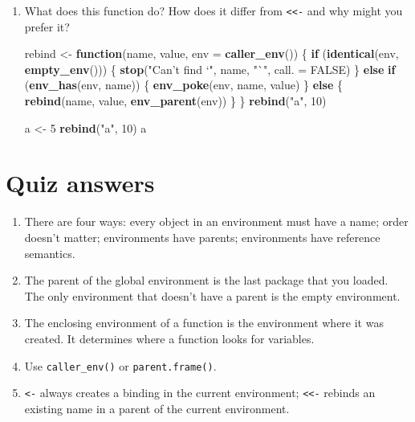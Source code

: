 \documentclass[]{book}
\newenvironment{Shaded}{\begin{snugshade}}{\end{snugshade}}
\newcommand{\ControlFlowTok}[1]{\textcolor[rgb]{0.13,0.29,0.53}{\textbf{#1}}}
\newcommand{\DataTypeTok}[1]{\textcolor[rgb]{0.13,0.29,0.53}{#1}}
\newcommand{\DecValTok}[1]{\textcolor[rgb]{0.00,0.00,0.81}{#1}}
\newcommand{\KeywordTok}[1]{\textcolor[rgb]{0.13,0.29,0.53}{\textbf{#1}}}
\newcommand{\NormalTok}[1]{#1}
\newcommand{\OtherTok}[1]{\textcolor[rgb]{0.56,0.35,0.01}{#1}}
\newcommand{\StringTok}[1]{\textcolor[rgb]{0.31,0.60,0.02}{#1}}
\theoremstyle{definition}
\theoremstyle{definition}
\theoremstyle{definition}
\theoremstyle{remark}
\begin{document}
\begin{enumerate}
\def\labelenumi{\arabic{enumi}.}
\item
  What does this function do? How does it differ from
  \texttt{\textless{}\textless{}-} and why might you prefer it?

\begin{Shaded}
\begin{Highlighting}[]
\NormalTok{rebind <-}\StringTok{ }\ControlFlowTok{function}\NormalTok{(name, value, }\DataTypeTok{env =} \KeywordTok{caller_env}\NormalTok{()) \{}
  \ControlFlowTok{if}\NormalTok{ (}\KeywordTok{identical}\NormalTok{(env, }\KeywordTok{empty_env}\NormalTok{())) \{}
    \KeywordTok{stop}\NormalTok{(}\StringTok{"Can't find `"}\NormalTok{, name, }\StringTok{"`"}\NormalTok{, }\DataTypeTok{call. =} \OtherTok{FALSE}\NormalTok{)}
\NormalTok{  \} }\ControlFlowTok{else} \ControlFlowTok{if}\NormalTok{ (}\KeywordTok{env_has}\NormalTok{(env, name)) \{}
    \KeywordTok{env_poke}\NormalTok{(env, name, value)}
\NormalTok{  \} }\ControlFlowTok{else}\NormalTok{ \{}
    \KeywordTok{rebind}\NormalTok{(name, value, }\KeywordTok{env_parent}\NormalTok{(env))}
\NormalTok{  \}}
\NormalTok{\}}
\KeywordTok{rebind}\NormalTok{(}\StringTok{"a"}\NormalTok{, }\DecValTok{10}\NormalTok{)}
\end{Highlighting}
\end{Shaded}

\begin{Shaded}
\begin{Highlighting}[]
\NormalTok{a <-}\StringTok{ }\DecValTok{5}
\KeywordTok{rebind}\NormalTok{(}\StringTok{"a"}\NormalTok{, }\DecValTok{10}\NormalTok{)}
\NormalTok{a}
\end{Highlighting}
\end{Shaded}
\end{enumerate}

\hypertarget{env-answers}{%
\section{Quiz answers}\label{env-answers}}

\begin{enumerate}
\def\labelenumi{\arabic{enumi}.}
\item
  There are four ways: every object in an environment must have a name;
  order doesn't matter; environments have parents; environments have
  reference semantics.
\item
  The parent of the global environment is the last package that you
  loaded. The only environment that doesn't have a parent is the empty
  environment.
\item
  The enclosing environment of a function is the environment where it
  was created. It determines where a function looks for variables.
\item
  Use \texttt{caller\_env()} or \texttt{parent.frame()}.
\item
  \texttt{\textless{}-} always creates a binding in the current
  environment; \texttt{\textless{}\textless{}-} rebinds an existing name
  in a parent of the current environment.
\end{enumerate}
\end{document}
